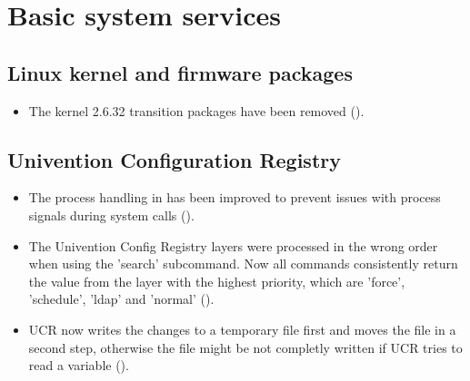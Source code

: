 



\section{Basic system services}


\subsection{Linux kernel and firmware packages}
\begin{itemize}
\item The kernel 2.6.32 transition packages have been removed ().
\end{itemize}

\subsection{Univention Configuration Registry}
\begin{itemize}
\item The process handling in  has been improved to prevent issues with process
  signals during system calls ().

\item The Univention Config Registry layers were processed in the wrong order when using the 'search' subcommand. Now all commands consistently return the value from the layer with the highest priority, which are 'force', 'schedule', 'ldap' and 'normal' ().

\item UCR now writes the changes to a temporary file first and moves the file
in a second step, otherwise the file might be not completly written if UCR
tries to read a variable ().
\end{itemize}

